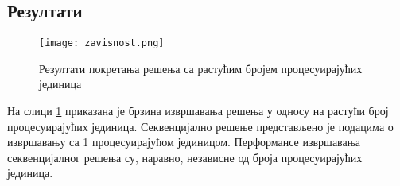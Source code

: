\subsection{Резултати}

\begin{figure}[H]
    \centering
    \texttt{[image: zavisnost.png]}
    \caption{Резултати покретања решења са растућим бројем процесуирајућих јединица}
    \label{fig:rezultati2}
\end{figure}

На слици \ref{fig:rezultati2} приказана је брзина извршавања решења у односу на растући број процесуирајућих јединица.
Секвенцијално решење представљено је подацима о извршавању са 1 процесуирајућом јединицом.
Перформансе извршавања секвенцијалног решења су, наравно, независне од броја процесуирајућих јединица.




\pagebreak